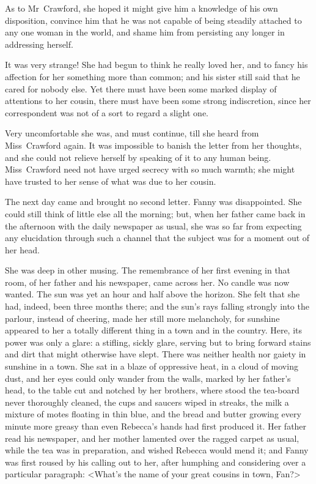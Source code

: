 As to Mr~Crawford, she hoped it might give him a knowledge of his own disposition, convince him that he was not capable of being steadily attached to any one woman in the world, and shame him from persisting any longer in addressing herself.

It was very strange! She had begun to think he really loved her, and to fancy his affection for her something more than common; and his sister still said that he cared for nobody else. Yet there must have been some marked display of attentions to her cousin, there must have been some strong indiscretion, since her correspondent was not of a sort to regard a slight one.

Very uncomfortable she was, and must continue, till she heard from Miss~Crawford again. It was impossible to banish the letter from her thoughts, and she could not relieve herself by speaking of it to any human being. Miss~Crawford need not have urged secrecy with so much warmth; she might have trusted to her sense of what was due to her cousin.

The next day came and brought no second letter. Fanny was disappointed. She could still think of little else all the morning; but, when her father came back in the afternoon with the daily newspaper as usual, she was so far from expecting any elucidation through such a channel that the subject was for a moment out of her head.

She was deep in other musing. The remembrance of her first evening in that room, of her father and his newspaper, came across her. No candle was now wanted. The sun was yet an hour and half above the horizon. She felt that she had, indeed, been three months there; and the sun's rays falling strongly into the parlour, instead of cheering, made her still more melancholy, for sunshine appeared to her a totally different thing in a town and in the country. Here, its power was only a glare: a stifling, sickly glare, serving but to bring forward stains and dirt that might otherwise have slept. There was neither health nor gaiety in sunshine in a town. She sat in a blaze of oppressive heat, in a cloud of moving dust, and her eyes could only wander from the walls, marked by her father's head, to the table cut and notched by her brothers, where stood the tea-board never thoroughly cleaned, the cups and saucers wiped in streaks, the milk a mixture of motes floating in thin blue, and the bread and butter growing every minute more greasy than even Rebecca's hands had first produced it. Her father read his newspaper, and her mother lamented over the ragged carpet as usual, while the tea was in preparation, and wished Rebecca would mend it; and Fanny was first roused by his calling out to her, after humphing and considering over a particular paragraph: <What's the name of your great cousins in town, Fan?>

